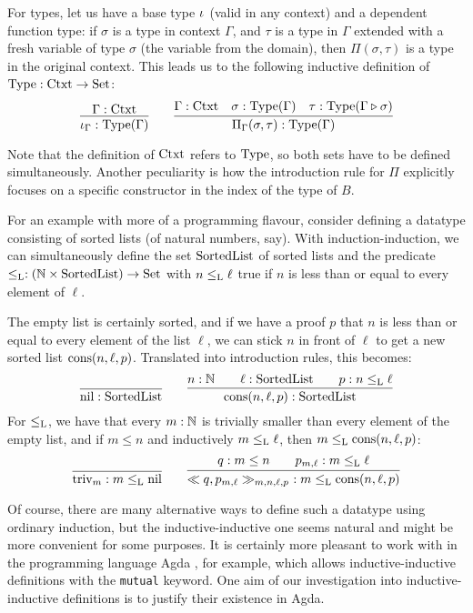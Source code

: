 \documentclass[orivec,envcountsame, ,envcountsect]{llncs}
\begin{document}
For types, let us have a base type $\iota_{}$ (valid in any context)
and a dependent function type: if $\sigma$ is a type in context $\Gamma$,
and $\tau$ is a type in $\Gamma$ extended with a fresh variable of type
$\sigma$ (the variable from the domain), then $\Pi(\sigma, \tau)$ is a
type in the original context. This leads us to the following inductive
definition of $\text{Type} : \text{Ctxt} \to \text{Set}$:
\[
\infer{\baseTy{\Gamma} : \Type(\Gamma)}{\Gamma : \Ctxt} \qquad
\infer{\piTy{\Gamma}{\sigma}{\tau} : \Type(\Gamma)}{\Gamma : \Ctxt
                    & \sigma : \Type(\Gamma)
                    & \tau : \Type(\consCtxt{\Gamma}{\sigma})}
\]

Note that the definition of $\text{Ctxt}$ refers to $\text{Type}$, so both sets
have to be defined simultaneously. Another peculiarity is how the
introduction rule for $\Pi$ explicitly focuses on a specific constructor
in the index of the type of $B$.

For an example with more of a programming flavour, consider defining a
datatype consisting of sorted lists (of natural numbers, say). With
induction-induction, we can simultaneously define the set
$\text{SortedList}$ of sorted lists and the predicate $\leq_{\text{L}} : (\mathbb{N}
\times \text{SortedList}) \to \text{Set}$ with $n \leq_{\text{L}} \ell$ true if $n$ is
less than or equal to every element of $\ell$.

The empty list is certainly sorted, and if we have a proof $p$ that
$n$ is less than or equal to every element of the list $\ell$, we can
stick $n$ in front of $\ell$ to get a new sorted list
$\text{cons}(n, \ell, p)$. Translated into introduction rules, this becomes:
\[
\infer{\nilList : \SortedList}{} \qquad
\infer{\consList{n}{\ell}{p} : \SortedList}{n : \Nat \quad & \ell : \SortedList \quad & p : n \lessList \ell}
\]
For $\leq_{\text{L}}$, we have that every $m : \mathbb{N}$ is trivially smaller
than every element of the empty list, and if $m \leq n$ and
inductively $m \leq_{\text{L}} \ell$, then $m \leq_{\text{L}} \text{cons}(n, \ell, p)$:
\[
\infer{\nilLess{m} : m \lessList \nilList}
{} \qquad
\infer{\consLess{n}{\ell}{p}{m}{q}{p_{m, \ell}}\ : m \lessList \consList{n}{\ell}{p}}
       {q : m \leq n \quad & p_{m, \ell} : m \lessList \ell}
\]

Of course, there are many alternative ways to define such a datatype
using ordinary induction, but the inductive-inductive one seems
natural and might be more convenient for some purposes. It is
certainly more pleasant to work with in the %
programming language Agda \cite{norell2007thesis}, for
example, which allows inductive-inductive definitions with the
\texttt{mutual} keyword. One aim of our investigation into
inductive-inductive definitions is to justify their existence in Agda.
\end{document}
